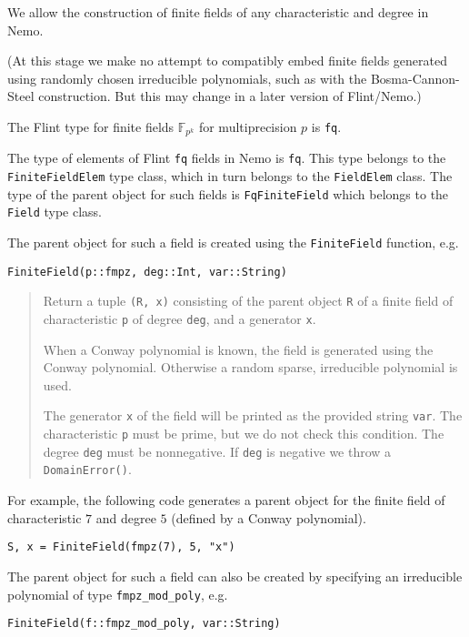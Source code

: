 \documentclass[a4paper,10pt]{article}
\newcommand{\F}{\mathbb{F}}
\newcommand{\code}{\lstinline}
\newcommand{\desc}[1]{\vspace{-3mm}\begin{quote}#1\end{quote}}
\begin{document}
{{We allow the construction of finite fields of any characteristic and degree in
Nemo.

(At this stage we make no attempt to compatibly embed finite fields generated 
using randomly chosen irreducible polynomials, such as with the 
Bosma-Cannon-Steel construction. But this may change in a later version of 
Flint/Nemo.)

The Flint type for finite fields $\F_{p^k}$ for multiprecision $p$ is
\code{fq}.

The type of elements of Flint \code{fq} fields in Nemo is \code{fq}.
This type belongs to the \code{FiniteFieldElem} type class, which in turn belongs
to the \code{FieldElem} class. The type of the parent object for such fields is
\code{FqFiniteField} which belongs to the \code{Field} type class.

The parent object for such a field is created using the \code{FiniteField}
function, e.g.

\begin{lstlisting}
FiniteField(p::fmpz, deg::Int, var::String)
\end{lstlisting}

\desc{Return a tuple \code{(R, x)} consisting of the parent object \code{R} of
a finite field of characteristic \code{p} of degree \code{deg}, and a
generator \code{x}.

When a Conway polynomial is known, the field is generated using the
Conway polynomial. Otherwise a random sparse, irreducible polynomial is used.

The generator \code{x} of the field will be printed as the provided string
\code{var}. The characteristic \code{p} must be prime, but we do not check this
condition. The degree \code{deg} must be nonnegative. If \code{deg} is negative
we throw a \code{DomainError()}.}

For example, the following code generates a parent object for the finite field
of characteristic $7$ and degree $5$ (defined by a Conway polynomial).

\begin{lstlisting}
S, x = FiniteField(fmpz(7), 5, "x")
\end{lstlisting}

The parent object for such a field can also be created by specifying
an irreducible polynomial of type \code{fmpz_mod_poly}, e.g.

\begin{lstlisting}
FiniteField(f::fmpz_mod_poly, var::String)
\end{lstlisting}

}}
\end{document}
